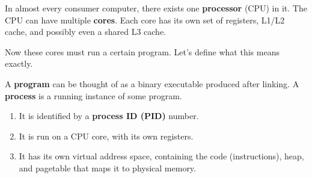 \documentclass{article}
\begin{document}
    \begin{definition}
      In almost every consumer computer, there exists one \textbf{processor} (CPU) in it. The CPU can have multiple \textbf{cores}. Each core has its own set of registers, L1/L2 cache, and possibly even a shared L3 cache. 
    \end{definition}

    Now these cores must run a certain program. Let's define what this means exactly. 

    \begin{definition}
      A \textbf{program} can be thought of as a binary executable produced after linking. A \textbf{process} is a running instance of some program. 
      \begin{enumerate}
        \item It is identified by a \textbf{process ID (PID)} number. 
        \item It is run on a CPU core, with its own registers. 
        \item It has its own virtual address space, containing the code (instructions), heap, and pagetable that maps it to physical memory. 
      \end{enumerate}
    \end{definition}
\end{document}
